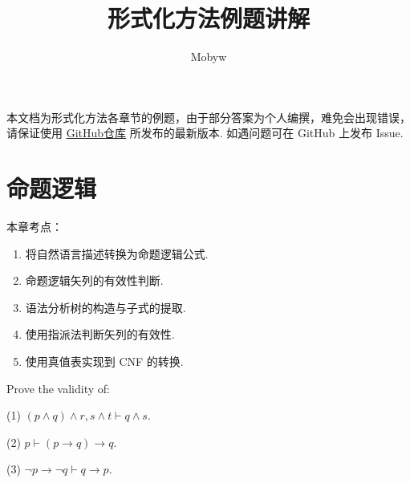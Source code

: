 \documentclass[cn, hazy, blue, normal, 12pt]{elegantnote}
\title{形式化方法例题讲解}
\author{Mobyw}
\date{\zhtoday}
\begin{document}
\maketitle


\doclicenseThis

本文档为形式化方法各章节的例题，由于部分答案为个人编撰，难免会出现错误，请保证使用 \href{https://github.com/mobyw/MasterCourseNotes/blob/master/FormalMethods/FormalMethodsExamples.tex}{GitHub仓库} 所发布的最新版本. 如遇问题可在 GitHub 上发布 Issue.

\section{命题逻辑}

本章考点：

\begin{enumerate}
    \item 将自然语言描述转换为命题逻辑公式.
    \item 命题逻辑矢列的有效性判断.
    \item 语法分析树的构造与子式的提取.
    \item 使用指派法判断矢列的有效性.
    \item 使用真值表实现到 CNF 的转换.
\end{enumerate}

\begin{exercise}

    Prove the validity of:

    (1) $ (p \wedge q) \wedge r, s \wedge t \vdash q \wedge s $.

    (2) $ p \vdash(p \rightarrow q) \rightarrow q $.

    (3) $ \neg p \rightarrow \neg q \vdash q \rightarrow p $.

\end{exercise}
\end{document}
